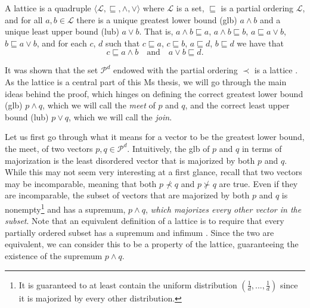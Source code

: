 \begin{definition}[Lattice] %
    A lattice is a quadruple $\langle \mathcal{L}, \sqsubseteq, \wedge, \vee \rangle$ where $\mathcal{L}$ is a set, $\sqsubseteq$ is a partial ordering $\mathcal{L}$, and for all $a, b \in \mathcal{L}$ there is a unique greatest lower bound (glb) $a \wedge b$ and a unique least upper bound (lub) $a \vee b$. That is, $a \wedge b \sqsubseteq a$, $a \wedge b \sqsubseteq b$, $a \sqsubseteq a \vee b$, $b \sqsubseteq a \vee b$, and for each $c$, $d$ such that $c \sqsubseteq a$, $c \sqsubseteq b$, $a \sqsubseteq d$, $b \sqsubseteq d$ we have that
    \begin{equation}
        c \sqsubseteq a \wedge b \quad \text{and} \quad a \vee b \sqsubseteq d.
    \end{equation}
\end{definition}

It was shown that the set $\mathcal{P}^d$ endowed with the partial ordering $\prec$ is a lattice \cite{cicalese_supermodularity_2002}. As the lattice is a central part of this Ms thesis, we will go through the main ideas behind the proof, which hinges on defining the correct greatest lower bound (glb) $p \wedge q$, which we will call the \textit{meet} of $p$ and $q$, and the correct least upper bound (lub) $p \vee q$, which we will call the \textit{join}.

Let us first go through what it means for a vector to be the greatest lower bound, the meet, of two vectors $p, q \in \mathcal{P}^d$. Intuitively, the glb of $p$ and $q$ in terms of majorization is the least disordered vector that is majorized by both $p$ and $q$. While this may not seem very interesting at a first glance, recall that two vectors may be incomparable, meaning that both $p \nprec q$ and $p \nsucc q$ are true. Even if they are incomparable, the subset of vectors that are majorized by both $p$ and $q$ is nonempty\footnote{It is guaranteed to at least contain the uniform distribution $(\frac{1}{d}, ..., \frac{1}{d})$ since it is majorized by every other distribution.} and has a supremum, $p \wedge q$, \textit{which majorizes every other vector in the subset}. Note that an equivalent definition of a lattice is to require that every partially ordered subset has a supremum and infimum \cite[p. 19]{marshall_inequalities_2011}. Since the two are equivalent, we can consider this to be a property of the lattice, guaranteeing the existence of the supremum $p \wedge q$.

